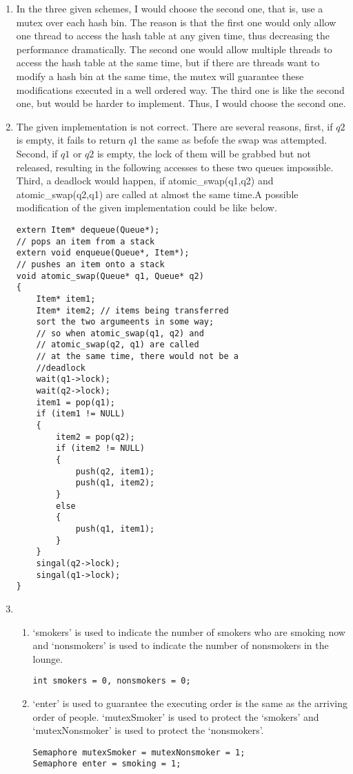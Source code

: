 \documentclass[12pt,a4paper]{article}
\begin{document}
	\begin{enumerate}
		\item In the three given schemes, I would choose the second one, that is, use a mutex over each hash bin. The reason is that the first one would only allow one thread to access the hash table at any given time, thus decreasing the performance dramatically. The second one would allow multiple threads to access the hash table at the same time, but if there are threads want to modify a hash bin at the same time, the mutex will guarantee these modifications executed in a well ordered way. The third one is like the second one, but would be harder to implement. Thus, I would choose the second one.
		
		\item The given implementation is not correct. There are several reasons, first, if $q2$ is empty, it fails to return $q1$ the same as befofe the swap was attempted. Second, if $q1$ or $q2$ is empty, the lock of them will be grabbed but not  released, resulting in the following accesses to these two queues impossible. Third, a deadlock would happen, if atomic\_swap(q1,q2) and atomic\_swap(q2,q1) are called at almost the same time.A possible modification of the given implementation could be like below.
{
\begin{lstlisting}
extern Item* dequeue(Queue*); 
// pops an item from a stack
extern void enqueue(Queue*, Item*); 
// pushes an item onto a stack
void atomic_swap(Queue* q1, Queue* q2)
{
	Item* item1;
	Item* item2; // items being transferred 
	sort the two argumeents in some way;
	// so when atomic_swap(q1, q2) and 
	// atomic_swap(q2, q1) are called
	// at the same time, there would not be a 
	//deadlock
	wait(q1->lock);
	wait(q2->lock);
	item1 = pop(q1);
	if (item1 != NULL)
	{
		item2 = pop(q2);
		if (item2 != NULL)
		{
			push(q2, item1);
			push(q1, item2);
		}
		else
		{
			push(q1, item1);
		}
	}
	singal(q2->lock);
	singal(q1->lock);
}
\end{lstlisting}
}
		\item 
			\begin{enumerate}
				\item `smokers' is used to indicate the number of smokers who are smoking now and `nonsmokers' is used to indicate the number of nonsmokers in the lounge.
				\begin{lstlisting}
int smokers = 0, nonsmokers = 0;
				\end{lstlisting}
				
				\item `enter' is used to guarantee the executing order is the same as the arriving order of people. `mutexSmoker' is used to protect the `smokers' and `mutexNonsmoker' is used to protect the `nonsmokers'.
				\begin{lstlisting}
Semaphore mutexSmoker = mutexNonsmoker = 1;
Semaphore enter = smoking = 1;
				\end{lstlisting}
				

\end{enumerate}
\end{enumerate}
\end{document}

